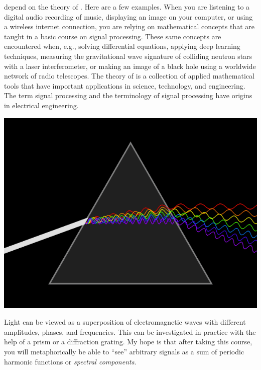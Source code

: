  depend on the theory of
. Here are a few examples.
When you are listening to a digital audio recording of music,
displaying an image on your computer, or using a wireless internet connection,
you are relying on mathematical concepts that are taught in a basic course on signal processing.
These same concepts are encountered when, e.g., solving differential equations,
applying deep learning techniques, measuring the gravitational wave signature of
colliding neutron stars with a laser interferometer, or making an image of a black hole
using a worldwide network of radio telescopes.
The theory of \emph{} is a collection of
applied mathematical tools that have important applications in science, technology, and engineering.
The term signal processing and the terminology of signal processing have origins in electrical engineering.

\begin{marginfigure}[-4.2cm]
	\begin{center}
		\includegraphics[width=\textwidth]{ch01/figures/prism.png}
	\end{center}
	\caption{Light can be viewed as a superposition of electromagnetic waves
		with different amplitudes, phases, and frequencies. This can be
		investigated in practice with the help of a prism or a diffraction
		grating. My hope is that after taking this course, you will
		metaphorically be able to ``see'' arbitrary signals as a sum of
		periodic harmonic functions or \emph{spectral components}.}
	\label{fig:prism}
\end{marginfigure}


